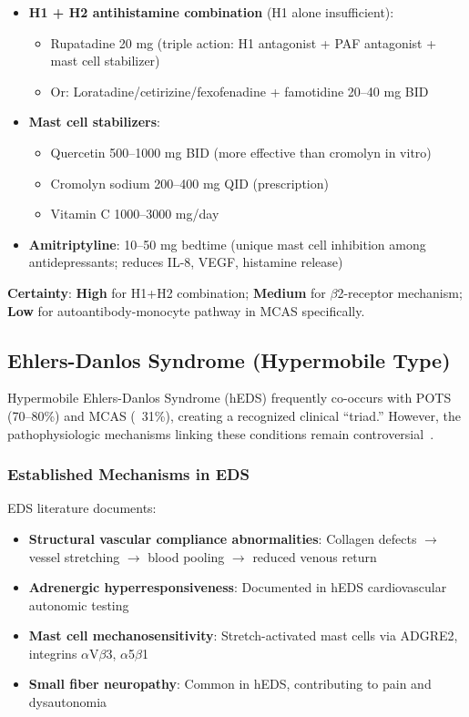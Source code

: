 \begin{itemize}
    \item \textbf{H1 + H2 antihistamine combination} (H1 alone insufficient):
    \begin{itemize}
        \item Rupatadine 20 mg (triple action: H1 antagonist + PAF antagonist + mast cell stabilizer)
        \item Or: Loratadine/cetirizine/fexofenadine + famotidine 20--40 mg BID
    \end{itemize}
    \item \textbf{Mast cell stabilizers}:
    \begin{itemize}
        \item Quercetin 500--1000 mg BID (more effective than cromolyn in vitro)
        \item Cromolyn sodium 200--400 mg QID (prescription)
        \item Vitamin C 1000--3000 mg/day
    \end{itemize}
    \item \textbf{Amitriptyline}: 10--50 mg bedtime (unique mast cell inhibition among antidepressants; reduces IL-8, VEGF, histamine release)
\end{itemize}

\textbf{Certainty}: \textbf{High} for H1+H2 combination; \textbf{Medium} for $\beta$2-receptor mechanism; \textbf{Low} for autoantibody-monocyte pathway in MCAS specifically.

\subsection{Ehlers-Danlos Syndrome (Hypermobile Type)}
\label{sec:eds}

Hypermobile Ehlers-Danlos Syndrome (hEDS) frequently co-occurs with POTS (70--80\%) and MCAS (~31\%), creating a recognized clinical ``triad.'' However, the pathophysiologic mechanisms linking these conditions remain controversial~\cite{Kucharik2020}.

\subsubsection{Established Mechanisms in EDS}

EDS literature documents:
\begin{itemize}
    \item \textbf{Structural vascular compliance abnormalities}: Collagen defects $\rightarrow$ vessel stretching $\rightarrow$ blood pooling $\rightarrow$ reduced venous return
    \item \textbf{Adrenergic hyperresponsiveness}: Documented in hEDS cardiovascular autonomic testing~\cite{Hakim2017}
    \item \textbf{Mast cell mechanosensitivity}: Stretch-activated mast cells via ADGRE2, integrins $\alpha$V$\beta$3, $\alpha$5$\beta$1~\cite{Royer2022mechanobiology}
    \item \textbf{Small fiber neuropathy}: Common in hEDS, contributing to pain and dysautonomia
\end{itemize}

